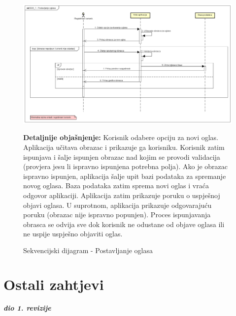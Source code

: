 				\begin{figure}[hp!]
					\centering
					\includegraphics[width=\textwidth]{slike/SD6_1 - Postavljanje oglasa.png}
					\caption{Sekvencijski dijagram - Postavljanje oglasa}
					\begin{flushleft}
						\textbf{Detaljnije objašnjenje:}
						Korisnik odabere opciju za novi oglas. Aplikacija učitava obrazac i prikazuje ga korisniku. Korisnik zatim ispunjava i šalje ispunjen obrazac nad kojim se provodi validacija (provjera jesu li ispravno ispunjena potrebna polja). Ako je obrazac ispravno ispunjen, aplikacija šalje upit bazi podataka za spremanje novog oglasa. Baza podataka zatim sprema novi oglas i vraća odgovor aplikaciji. Aplikacija zatim prikazuje poruku o uspješnoj objavi oglasa. U suprotnom, aplikacija prikazuje odgovarajuću poruku (obrazac nije ispravno popunjen). Proces ispunjavanja obrasca se odvija sve dok korisnik ne odustane od objave oglasa ili ne uspije uspješno objaviti oglas. 
					\end{flushleft}
				\end{figure}
				\eject

		\section{Ostali zahtjevi}
		
			\textbf{\textit{dio 1. revizije}}\\

